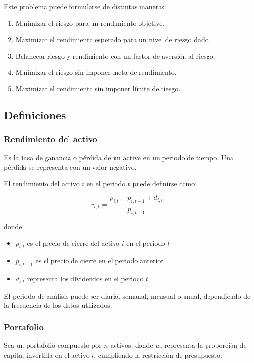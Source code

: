 \documentclass[12pt]{article}
\begin{document}
Este problema puede formularse de distintas maneras:

\begin{enumerate}[label=\Roman*., leftmargin=1.5cm]
  \item Minimizar el riesgo para un rendimiento objetivo.
  \item Maximizar el rendimiento esperado para un nivel de riesgo dado.
  \item Balancear riesgo y rendimiento con un factor de aversión al riesgo.
  \item Minimizar el riesgo sin imponer meta de rendimiento.
  \item Maximizar el rendimiento sin imponer límite de riesgo.
\end{enumerate}

\subsection{Definiciones}

\subsubsection{Rendimiento del activo}
Es la tasa de ganancia o pérdida de un activo en un periodo de tiempo.
Una pérdida se representa con un valor negativo.

El rendimiento del activo $i$ en el periodo $t$ puede definirse como:

\begin{equation}
  r_{i,t} = \frac{p_{i,t} - p_{i,t-1} + d_{i,t}}{p_{i,t-1}}
\end{equation}

donde:
\begin{itemize}
  \item $p_{i,t}$ es el precio de cierre del activo $i$ en el periodo $t$
  \item $p_{i,t-1}$ es el precio de cierre en el periodo anterior
  \item $d_{i,t}$ representa los dividendos en el periodo $t$
\end{itemize}

El periodo de análisis puede ser diario, semanal, mensual o anual,
dependiendo de la frecuencia de los datos utilizados.

\subsubsection{Portafolio}

Sea un portafolio compuesto por $n$ activos, donde $w_i$ representa la
proporción de capital invertida en el activo $i$, cumpliendo la
restricción de presupuesto:
\end{document}
